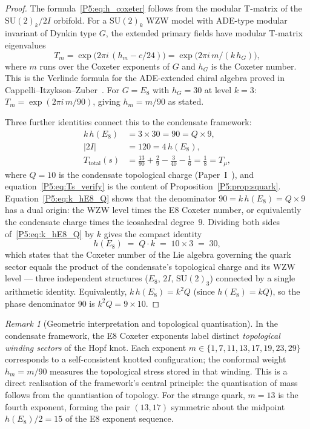 \documentclass[11pt,a4paper]{article}
\theoremstyle{definition}
\theoremstyle{remark}
\newtheorem{remark}[theorem]{Remark}
\begin{document}
\begin{proof}
The formula~\eqref{P5:eq:h_coxeter} follows from the modular T-matrix of the
$\mathrm{SU}(2)_k/2I$ orbifold.
For a $\mathrm{SU}(2)_k$ WZW model with ADE-type modular invariant of
Dynkin type $G$, the extended primary fields have modular T-matrix eigenvalues
\begin{equation}
  T_m = \exp\!\bigl(2\pi i\,(h_m - c/24)\bigr)
  = \exp\!\bigl(2\pi i\, m/(k\,h_G)\bigr),
  \label{P5:eq:T_coxeter}
\end{equation}
where $m$ runs over the Coxeter exponents of $G$ and $h_G$ is the Coxeter number.
This is the Verlinde formula for the ADE-extended chiral algebra proved in
Cappelli--Itzykson--Zuber~\cite{CIZ1987}.
For $G = E_8$ with $h_G = 30$ at level $k=3$: $T_m = \exp(2\pi i\, m/90)$,
giving $h_m = m/90$ as stated.

Three further identities connect this to the condensate framework:
\begin{align}
  k\,h(E_8) &= 3 \times 30 = 90 = Q \times 9, \label{P5:eq:k_hE8_Q} \\
  |2I| &= 120 = 4\,h(E_8), \label{P5:eq:2I_hE8} \\
  T_{\mathrm{total}}(s) &= \tfrac{13}{90} + \tfrac{2}{9} - \tfrac{3}{40} - \tfrac{1}{6} = \tfrac{1}{8} = T_\mu, \label{P5:eq:Ts_verify}
\end{align}
where $Q=10$ is the condensate topological charge (Paper~I~\cite{Paper1}),
and equation~\eqref{P5:eq:Ts_verify} is the content of Proposition~\ref{P5:prop:squark}.
Equation~\eqref{P5:eq:k_hE8_Q} shows that the denominator $90 = k\,h(E_8) = Q \times 9$
has a dual origin: the WZW level times the E8 Coxeter number, or equivalently
the condensate charge times the icosahedral degree~$9$.
Dividing both sides of~\eqref{P5:eq:k_hE8_Q} by $k$ gives the compact identity
\begin{equation}
  h(E_8) \;=\; Q\cdot k \;=\; 10 \times 3 \;=\; 30,
  \label{P5:eq:hE8_Qk}
\end{equation}
which states that the Coxeter number of the Lie algebra governing the quark
sector equals the product of the condensate's topological charge and its
WZW level --- three independent structures ($E_8$, $2I$, $\mathrm{SU}(2)_3$)
connected by a single arithmetic identity.
Equivalently, $k\,h(E_8) = k^2 Q$ (since $h(E_8) = kQ$), so the
phase denominator 90 is $k^2 Q = 9 \times 10$.
\end{proof}

\begin{remark}[Geometric interpretation and topological quantisation]
\label{P5:rem:h2I_geometric}
In the condensate framework, the E8 Coxeter exponents label distinct
\emph{topological winding sectors} of the Hopf knot.
Each exponent $m \in \{1,7,11,13,17,19,23,29\}$ corresponds to a
self-consistent knotted configuration; the conformal weight $h_m = m/90$
measures the topological stress stored in that winding.
This is a direct realisation of the framework's central principle:
the quantisation of mass follows from the quantisation of topology.
For the strange quark, $m=13$ is the fourth exponent, forming the pair
$(13,17)$ symmetric about the midpoint $h(E_8)/2 = 15$ of the E8 exponent sequence.
\end{remark}
\end{document}
